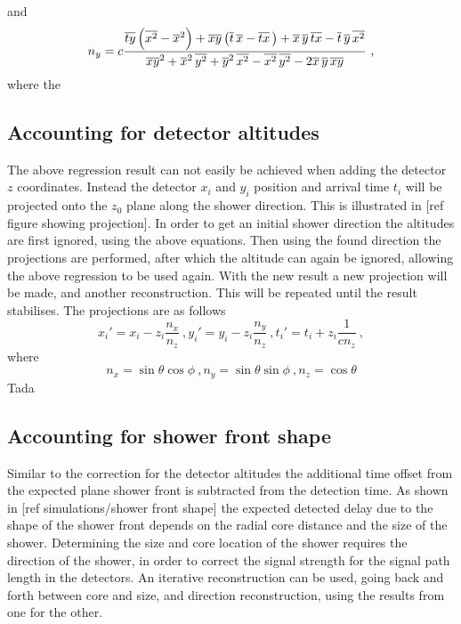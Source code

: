 %
and
%
\begin{equation}
n_y = c \frac{\overline{t y} \left( \overline{x^2} - \overline{x}^2 \right) +
              \overline{x y} \left( \overline{t} \, \overline{x} - \overline{t x} \, \right) +
              \overline{x} \, \overline{y} \, \overline{t x} -
              \overline{t} \, \overline{y} \, \overline{x^2}}
             {\overline{x y}^2 + \overline{x}^2 \, \overline{y^2} +
              \overline{y}^2 \, \overline{x^2} - \overline{x^2} \, \overline{y^2} -
              2 \overline{x} \, \overline{y} \, \overline{x y}} \ ,
\end{equation}
%
where the


\subsection{Accounting for detector altitudes}

The above regression result can not easily be achieved when adding the detector $z$ coordinates. Instead the detector $x_i$ and $y_i$ position and arrival time $t_i$ will be projected onto the $z_0$ plane along the shower direction. This is illustrated in [ref figure showing projection]. In order to get an initial shower direction the altitudes are first ignored, using the above equations. Then using the found direction the projections are performed, after which the altitude can again be ignored, allowing the above regression to be used again. With the new result a new projection will be made, and another reconstruction. This will be repeated until the result stabilises. The projections are as follows
%
\begin{equation}
    x_i' = x_i - z_i \frac{n_x}{n_z} \ ,
    y_i' = y_i - z_i \frac{n_y}{n_z} \ ,
    t_i' = t_i + z_i \frac{1}{c n_z} \ ,
\end{equation}
%
where
%
\begin{equation}
    n_x = \sin \theta \cos \phi \ ,
    n_y = \sin \theta \sin \phi \ ,
    n_z = \cos \theta
\end{equation}
%
Tada

\subsection{Accounting for shower front shape}

Similar to the correction for the detector altitudes the additional time offset from the expected plane shower front is subtracted from the detection time. As shown in [ref simulations/shower front shape] the expected detected delay due to the shape of the shower front depends on the radial core distance and the size of the shower. Determining the size and core location of the shower requires the direction of the shower, in order to correct the signal strength for the signal path length in the detectors. An iterative reconstruction can be used, going back and forth between core and size, and direction reconstruction, using the results from one for the other.

